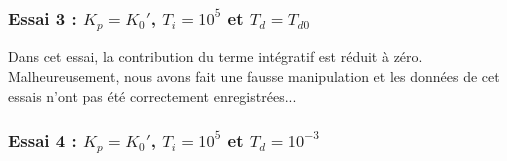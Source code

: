 \subsubsection{Essai 3 : $K_{p} = K_{0}'$, $T_{i} = 10^{5}$ et $T_{d} = T_{d0}$}

Dans cet essai, la contribution du terme intégratif est réduit à zéro.\\
Malheureusement, nous avons fait une fausse manipulation et les données de
cet essais n'ont pas été correctement enregistrées...



\subsubsection{Essai 4 : $K_{p} = K_{0}'$, $T_{i} = 10^{5}$ et $T_{d} = 10^{-3}$}

